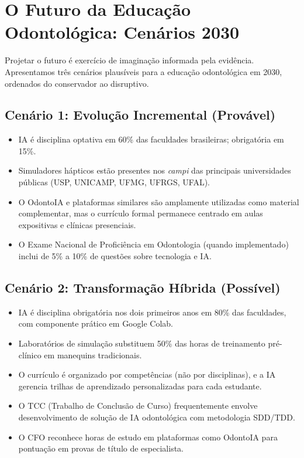 \section{O Futuro da Educação Odontológica: Cenários 2030}
\label{sec:futuro-educacao}

\nivelquatro

Projetar o futuro é exercício de imaginação informada pela evidência.
Apresentamos três cenários plausíveis para a educação odontológica em 2030,
ordenados do conservador ao disruptivo.

\subsection{Cenário 1: Evolução Incremental (Provável)}

\begin{itemize}
  \item IA é disciplina optativa em 60\% das faculdades brasileiras; obrigatória
    em 15\%.
  \item Simuladores hápticos estão presentes nos \textit{campi} das principais
    universidades públicas (USP, UNICAMP, UFMG, UFRGS, UFAL).
  \item O OdontoIA e plataformas similares são amplamente utilizadas como
    material complementar, mas o currículo formal permanece centrado em aulas
    expositivas e clínicas presenciais.
  \item O Exame Nacional de Proficiência em Odontologia (quando implementado)
    inclui de 5\% a 10\% de questões sobre tecnologia e IA.
\end{itemize}

\subsection{Cenário 2: Transformação Híbrida (Possível)}

\begin{itemize}
  \item IA é disciplina obrigatória nos dois primeiros anos em 80\% das
    faculdades, com componente prático em Google Colab.
  \item Laboratórios de simulação substituem 50\% das horas de treinamento
    pré-clínico em manequins tradicionais.
  \item O currículo é organizado por competências (não por disciplinas), e a
    IA gerencia trilhas de aprendizado personalizadas para cada estudante.
  \item O TCC (Trabalho de Conclusão de Curso) frequentemente envolve
    desenvolvimento de solução de IA odontológica com metodologia SDD/TDD.
  \item O CFO reconhece horas de estudo em plataformas como OdontoIA para
    pontuação em provas de título de especialista.
\end{itemize}

